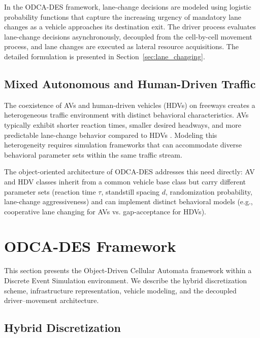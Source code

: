\documentclass[review,authoryear]{elsarticle}
\begin{document}
In the ODCA-DES framework, lane-change decisions are modeled using logistic probability functions that capture the increasing urgency of mandatory lane changes as a vehicle approaches its destination exit. The driver process evaluates lane-change decisions asynchronously, decoupled from the cell-by-cell movement process, and lane changes are executed as lateral resource acquisitions. The detailed formulation is presented in Section~\ref{sec:lane_changing}.

\subsection{Mixed Autonomous and Human-Driven Traffic}
\label{sec:lit_mixed}

The coexistence of AVs and human-driven vehicles (HDVs) on freeways creates a heterogeneous traffic environment with distinct behavioral characteristics. AVs typically exhibit shorter reaction times, smaller desired headways, and more predictable lane-change behavior compared to HDVs \citep{talebpour2016influence, shladover2012impacts, vanarem2006effects}. Modeling this heterogeneity requires simulation frameworks that can accommodate diverse behavioral parameter sets within the same traffic stream.

The object-oriented architecture of ODCA-DES addresses this need directly: AV and HDV classes inherit from a common vehicle base class but carry different parameter sets (reaction time $\tau$, standstill spacing $d$, randomization probability, lane-change aggressiveness) and can implement distinct behavioral models (e.g., cooperative lane changing for AVs vs. gap-acceptance for HDVs).


\section{ODCA-DES Framework}
\label{sec:framework}

This section presents the Object-Driven Cellular Automata framework within a Discrete Event Simulation environment. We describe the hybrid discretization scheme, infrastructure representation, vehicle modeling, and the decoupled driver--movement architecture.

\subsection{Hybrid Discretization}
\label{sec:discretization}
\end{document}
